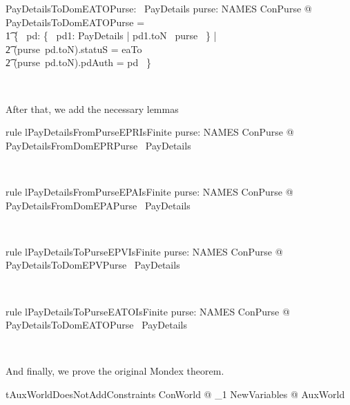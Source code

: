 %
\begin{LNewADef}
\begin{axdef}
   PayDetailsToDomEATOPurse: \power~PayDetails
\where
    \forall purse: NAMES \finj ConPurse @ PayDetailsToDomEATOPurse = \\
    \t1 \{~ pd: \{~ pd1: PayDetails | pd1.toN \in \dom~purse ~\} | \\
        \t2 (purse~pd.toN).statuS = eaTo \land \\
        \t2 (purse~pd.toN).pdAuth = pd ~\}
\end{axdef}~\end{LNewADef}
%
After that, we add the necessary lemmas
%
\begin{LNewLemma}
\begin{theorem}{rule lPayDetailsFromPurseEPRIsFinite}
    \forall purse: NAMES \finj ConPurse @ PayDetailsFromDomEPRPurse \in \finset~PayDetails
\end{theorem}~\end{LNewLemma}

\begin{LNewLemma}
\begin{theorem}{rule lPayDetailsFromPurseEPAIsFinite}
    \forall purse: NAMES \finj ConPurse @ PayDetailsFromDomEPAPurse \in \finset~PayDetails
\end{theorem}~\end{LNewLemma}

\begin{LNewLemma}
\begin{theorem}{rule lPayDetailsToPurseEPVIsFinite}
    \forall purse: NAMES \finj ConPurse @ PayDetailsToDomEPVPurse \in \finset~PayDetails
\end{theorem}~\end{LNewLemma}

\begin{LNewLemma}
\begin{theorem}{rule lPayDetailsToPurseEATOIsFinite}
    \forall purse: NAMES \finj ConPurse @ PayDetailsToDomEATOPurse \in \finset~PayDetails
\end{theorem}~\end{LNewLemma}
%
And finally, we prove the original Mondex theorem.
%
\begin{LThm} %
\begin{theorem}{tAuxWorldDoesNotAddConstraints}
   \forall ConWorld @ \exists_1 NewVariables @ AuxWorld
\end{theorem}~\end{LThm}

